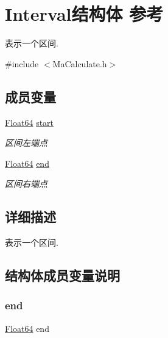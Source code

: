 \hypertarget{struct_interval}{}\section{Interval结构体 参考}
\label{struct_interval}


表示一个区间.  




{\ttfamily \#include $<$Ma\+Calculate.\+h$>$}

\subsection*{成员变量}
\begin{DoxyCompactItemize}
\item 
\mbox{\hyperlink{_type_and_consts_8h_a3f1431cb9f76da10f59246d1d743dc2c}{Float64}} \mbox{\hyperlink{struct_interval_a32be7f9967586b049961daa00b62069c}{start}}
\begin{DoxyCompactList}\small\item\em 区间左端点 \end{DoxyCompactList}\item 
\mbox{\hyperlink{_type_and_consts_8h_a3f1431cb9f76da10f59246d1d743dc2c}{Float64}} \mbox{\hyperlink{struct_interval_a9d014ab0dd1707f6c5d2a70370746263}{end}}
\begin{DoxyCompactList}\small\item\em 区间右端点 \end{DoxyCompactList}\end{DoxyCompactItemize}


\subsection{详细描述}
表示一个区间. 

\subsection{结构体成员变量说明}
\mbox{\label{struct_interval_a9d014ab0dd1707f6c5d2a70370746263}} 
\subsubsection{\texorpdfstring{end}{end}}
{\footnotesize\ttfamily \mbox{\hyperlink{_type_and_consts_8h_a3f1431cb9f76da10f59246d1d743dc2c}{Float64}} end}



